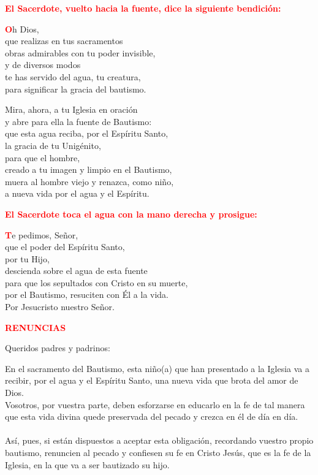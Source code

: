 \documentclass[12pt, letterpaper]{report}
\begin{document}
\large {\bfseries \textcolor{red}{El Sacerdote, vuelto hacia la fuente, dice la siguiente bendici\'on:}} \newline

\lettrine[lines=1]{\bfseries \textcolor{red}{O}}{}\Large h Dios, \\
que realizas en tus sacramentos \\
obras admirables con tu poder invisible, \\
y de diversos modos \\
te has servido del agua, tu creatura, \\
para significar la gracia del bautismo. \newline

\newpage

\Large Mira, ahora, a tu Iglesia en oraci\'on \\
y abre para ella la fuente de Bautismo: \\
que esta agua reciba, por el Esp\'iritu Santo, \\
la gracia de tu Unig\'enito, \\
para que el hombre, \\
creado a tu imagen y limpio en el Bautismo, \\
muera al hombre viejo y renazca, como ni\~no, \\
a nueva vida por el agua y el Esp\'iritu. \newline

\large {\bfseries \textcolor{red}{El Sacerdote toca el agua con la mano derecha y prosigue:}}

\lettrine[lines=1]{\bfseries \textcolor{red}{T}}{}\Large e pedimos, Se\~nor, \\
que el poder del Esp\'iritu Santo, \\
por tu Hijo, \\
descienda sobre el agua de esta fuente \\
para que los sepultados con Cristo en su muerte, \\
por el Bautismo, resuciten con \'El a la vida. \\
Por Jesucristo nuestro Se\~nor. \newline

\Large {\bfseries \textcolor{red}{RENUNCIAS}} \newline

\Large Queridos padres y padrinos: \newline

\Large En el sacramento del Bautismo, esta ni\~no(a) que han presentado a la Iglesia va a recibir, por el agua y el Esp\'iritu Santo, una nueva vida que brota del amor de Dios.\\
Vosotros, por vuestra parte, deben esforzarse en educarlo en la fe de tal manera que esta vida divina quede preservada del pecado y crezca en \'el de d\'ia en d\'ia. \\ \\
As\'i, pues, si est\'an dispuestos a aceptar esta obligaci\'on, recordando vuestro propio bautismo, renuncien al pecado y confiesen su fe en Cristo Jes\'us, que es la fe de la Iglesia, en la que va a ser bautizado su hijo. \newline
\end{document}
